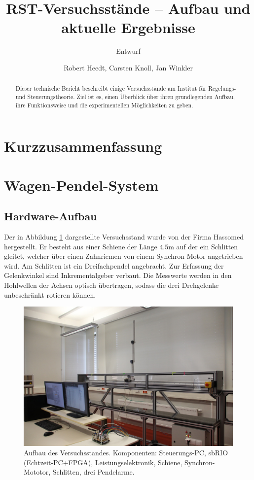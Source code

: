 \documentclass[a4paper,10pt]{scrartcl}
\title{RST-Versuchsstände  -- Aufbau und aktuelle Ergebnisse}
\subtitle{Entwurf}
\author{Robert Heedt, Carsten Knoll, Jan Winkler}
\begin{document}
\maketitle

\section*{Kurzzusammenfassung}
\begin{abstract}
Dieser technische Bericht beschreibt einige Versuchsstände am Institut für Regelungs- und Steuerungstheorie.
Ziel ist es, einen Überblick über ihren grundlegenden Aufbau, ihre Funktionsweise und die experimentellen Möglichkeiten zu geben.
\end{abstract}

\section{Wagen-Pendel-System}



\subsection{Hardware-Aufbau} 

Der in Abbildung \ref{fig_3fachpendel_foto} dargestellte Versuchsstand wurde von der Firma Hassomed \cite{Hassomed} hergestellt.
Er besteht aus einer Schiene der Länge $4.5$m auf der ein Schlitten gleitet, welcher über einen Zahnriemen von einem Synchron-Motor angetrieben wird.
Am Schlitten ist ein Dreifachpendel angebracht. Zur Erfassung der Gelenkwinkel sind Inkrementalgeber verbaut. Die Messwerte werden in den Hohlwellen der Achsen optisch übertragen, sodass die drei Drehgelenke unbeschränkt rotieren können. 
\begin{figure}[h!]
\begin{center}
\includegraphics[width=.8\textwidth]{img/3fach_pendel_klein.jpg}
\end{center}
\caption{Aufbau des Versuchsstandes. Komponenten: Steuerungs-PC, sbRIO (Echtzeit-PC+FPGA), Leistungselektronik, Schiene, Synchron-Mototor, Schlitten, drei Pendelarme.}
\label{fig_3fachpendel_foto}
\end{figure}
\end{document}
